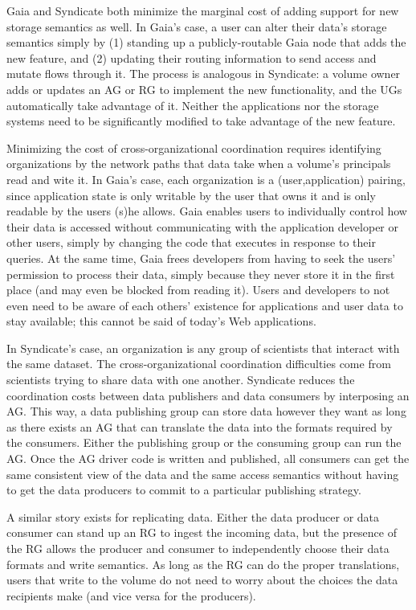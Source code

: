 Gaia and Syndicate both minimize the marginal cost of adding support for new
storage semantics as well.  In Gaia's case, a user can alter their data's
storage semantics simply by (1) standing up a publicly-routable Gaia node that adds the new
feature, and (2) updating their routing information to send access and mutate
flows through it.  The process is analogous in
Syndicate:  a volume owner adds or updates an AG or RG to implement the new
functionality, and the UGs automatically take advantage of it.
Neither the applications nor the
storage systems need to be significantly modified to take advantage of the new
feature.

Minimizing the cost of cross-organizational coordination requires identifying
organizations by the network paths that data take when a volume's principals
read and wite it.  In Gaia's case, each organization is a (user,application) pairing, since
application state is only writable by the user that owns it and is only readable
by the users (s)he allows.  Gaia enables users to individually control how their
data is accessed without communicating with the application developer or other
users, simply by changing the code that executes in response to their queries.
At the same time, Gaia
frees developers from having to seek the users' permission to process
their data, simply because they never store it in the first place (and may even
be blocked from reading it).  Users and developers to not even need to be aware
of each others' existence for applications and user data to stay available; this
cannot be said of today's Web applications.

In Syndicate's case, an organization is any group of scientists
that interact with the same dataset.  The cross-organizational coordination
difficulties come from scientists trying to share data with one another.
Syndicate reduces the coordination costs between data publishers and data consumers by
interposing an AG.  This way, a data publishing group can store data however
they want as long as there exists an AG that can translate the data into the
formats required by the consumers.  Either the publishing group or the consuming
group can run the AG.  Once the AG driver code is written and published,
all consumers can get the same consistent view of the data and the same access
semantics without having to get the data producers to commit to a particular
publishing strategy.

A similar story exists for replicating data.  Either the data producer or data
consumer can stand up an RG to ingest the incoming data, but the presence of the
RG allows the producer and consumer to independently choose their data formats
and write semantics.  As long as the RG can do the proper translations, users
that write to the volume do not need to worry about the choices the data
recipients make (and vice versa for the producers).

